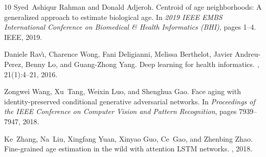 \documentclass[numbers,webpdf]{ima-authoring-template}%
\theoremstyle{thmstyletwo}%
\numberwithin{equation}{section}
\begin{document}
\begin{thebibliography}{10}
Syed~Ashiqur Rahman and Donald Adjeroh.
\newblock Centroid of age neighborhoods: A generalized approach to estimate
  biological age.
\newblock In {\em 2019 IEEE EMBS International Conference on Biomedical \&
  Health Informatics (BHI)}, pages 1--4. IEEE, 2019.

Daniele Rav{\`\i}, Charence Wong, Fani Deligianni, Melissa Berthelot, Javier
  Andreu-Perez, Benny Lo, and Guang-Zhong Yang.
\newblock Deep learning for health informatics.
,
  21(1):4--21, 2016.

Zongwei Wang, Xu~Tang, Weixin Luo, and Shenghua Gao.
\newblock Face aging with identity-preserved conditional generative adversarial
  networks.
\newblock In {\em Proceedings of the IEEE Conference on Computer Vision and
  Pattern Recognition}, pages 7939--7947, 2018.

Ke~Zhang, Na~Liu, Xingfang Yuan, Xinyao Guo, Ce~Gao, and Zhenbing Zhao.
\newblock Fine-grained age estimation in the wild with attention {LSTM}
  networks.
, 2018.

\end{thebibliography}


%
%
\end{document}
